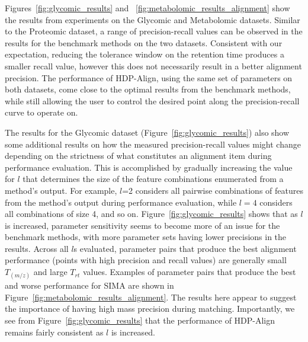 Figures~\ref{fig:glycomic_results} and ~\ref{fig:metabolomic_results_alignment} show the results from experiments on the Glycomic and Metabolomic datasets. Similar to the Proteomic dataset, a range of precision-recall values can be observed in the results for the benchmark methods on the two datasets. Consistent with our expectation, reducing the tolerance window on the retention time produces a smaller recall value, however this does not necessarily result in a better alignment precision. The performance of HDP-Align, using the same set of parameters on both datasets, come close to the optimal results from the benchmark methods, while still allowing the user to control the desired point along the precision-recall curve to operate on.

The results for the Glycomic dataset (Figure~\ref{fig:glycomic_results}) also show some additional results on how the measured precision-recall values might change depending on the strictness of what constitutes an alignment item during performance evaluation. This is accomplished by gradually increasing the value for $l$ that determines the size of the feature combinations enumerated from a method's output. For example, $l$=2 considers all pairwise combinations of features from the method's output during performance evaluation, while $l=4$ considers all combinations of size 4, and so on. Figure~\ref{fig:glycomic_results} shows that as $l$ is increased, parameter sensitivity seems to become more of an issue for the benchmark methods, with more parameter sets having lower precisions in the results. Across all $l$s evaluated, parameter pairs that produce the best alignment performance (points with high precision and recall values) are generally small $T_{(m/z)}$ and large $T_{rt}$ values. Examples of parameter pairs that produce the best and worse performance for SIMA are shown in Figure~\ref{fig:metabolomic_results_alignment}. The results here appear to suggest the importance of having high mass precision during matching. Importantly, we see from Figure~\ref{fig:glycomic_results} that the performance of HDP-Align remains fairly consistent as $l$ is increased.

